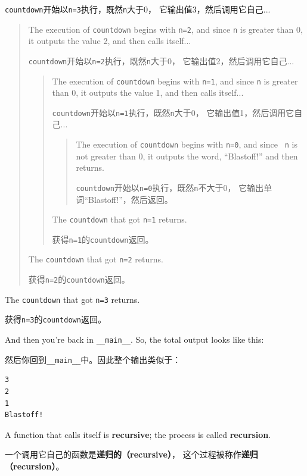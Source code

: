 \documentclass[10pt]{book}
\begin{document}
\begin{CJK}{UTF8}{gbsn}
{\tt countdown}开始以{\tt n=3}执行，既然{\tt n}大于0，
它输出值3，然后调用它自己...

\begin{quote}
The execution of {\tt countdown} begins with {\tt n=2}, and since
{\tt n} is greater than 0, it outputs the value 2, and then calls itself...

{\tt countdown}开始以{\tt n=2}执行，既然{\tt n}大于0，
它输出值2，然后调用它自己...

\begin{quote}
The execution of {\tt countdown} begins with {\tt n=1}, and since
{\tt n} is greater than 0, it outputs the value 1, and then calls itself...

{\tt countdown}开始以{\tt n=1}执行，既然{\tt n}大于0，
它输出值1，然后调用它自己...

\begin{quote}
The execution of {\tt countdown} begins with {\tt n=0}, and since {\tt
n} is not greater than 0, it outputs the word, ``Blastoff!'' and then
returns.

{\tt countdown}开始以{\tt n=0}执行，既然{\tt n}不大于0，
它输出单词``Blastoff!''，然后返回。

\end{quote}

The {\tt countdown} that got {\tt n=1} returns.

获得{\tt n=1}的{\tt countdown}返回。

\end{quote}

The {\tt countdown} that got {\tt n=2} returns.

获得{\tt n=2}的{\tt countdown}返回。

\end{quote}

The {\tt countdown} that got {\tt n=3} returns.

获得{\tt n=3}的{\tt countdown}返回。

And then you're back in \verb"__main__".  So, the
total output looks like this:

然后你回到\verb"__main__"中。因此整个输出类似于：

\begin{verbatim}
3
2
1
Blastoff!
\end{verbatim}
%
A function that calls itself is {\bf recursive}; the process is
called {\bf recursion}.

一个调用它自己的函数是{\bf 递归的（recursive）}，
这个过程被称作{\bf 递归（recursion）}。


\end{CJK}
\end{document}
